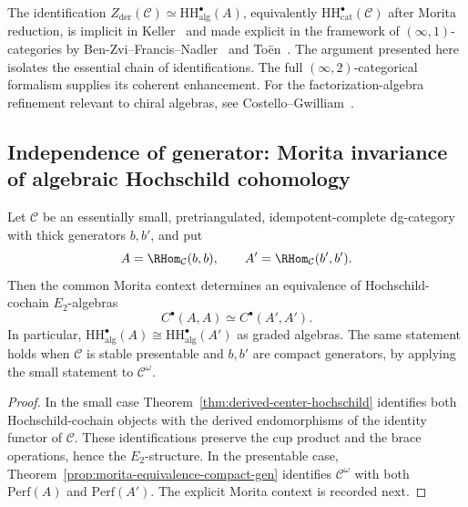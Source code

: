 \begin{remark}[Provenance]
\label{rem:derived-center-provenance}
The identification
$Z_{\mathrm{der}}(\mathcal{C}) \simeq
\mathrm{HH}^\bullet_{\mathrm{alg}}(A)$, equivalently
$\mathrm{HH}^\bullet_{\mathrm{cat}}(\mathcal{C})$ after Morita
reduction, is implicit in Keller~\cite{Keller06} and
made explicit in the framework of $(\infty,1)$-categories by
Ben-Zvi--Francis--Nadler~\cite{BZFN10} and
To\"en~\cite{Toen07}. The argument presented here isolates the
essential chain of identifications.  The full
$(\infty,2)$-categorical formalism supplies its coherent enhancement.
For the factorization-algebra
refinement relevant to chiral algebras, see
Costello--Gwilliam~\cite[Chapter~5]{CG17}.
\end{remark}

\subsection{Independence of generator: Morita invariance of
algebraic Hochschild cohomology}

\begin{theorem}
\label{thm:morita-invariance-HH}
Let $\mathcal C$ be an essentially small, pretriangulated,
idempotent-complete dg-category with thick generators $b,b'$, and put
\[
 A=\RHom_{\mathcal C}(b,b),
 \qquad
 A'=\RHom_{\mathcal C}(b',b').
\]
Then the common Morita context determines an equivalence of
Hochschild-cochain $E_2$-algebras
\[
 C^\bullet(A,A)\simeq C^\bullet(A',A').
\]
In particular,
$\mathrm{HH}^\bullet_{\mathrm{alg}}(A)\cong
\mathrm{HH}^\bullet_{\mathrm{alg}}(A')$ as graded algebras.  The same
statement holds when $\mathcal C$ is stable presentable and $b,b'$ are
compact generators, by applying the small statement to
$\mathcal C^\omega$.
\end{theorem}

\begin{proof}
In the small case Theorem~\ref{thm:derived-center-hochschild}
identifies both Hochschild-cochain objects with the derived
endomorphisms of the identity functor of $\mathcal C$.  These
identifications preserve the cup product and the brace operations,
hence the $E_2$-structure.  In the presentable case,
Theorem~\ref{prop:morita-equivalence-compact-gen} identifies
$\mathcal C^\omega$ with both $\mathrm{Perf}(A)$ and
$\mathrm{Perf}(A')$.  The explicit Morita context is recorded next.
\end{proof}

